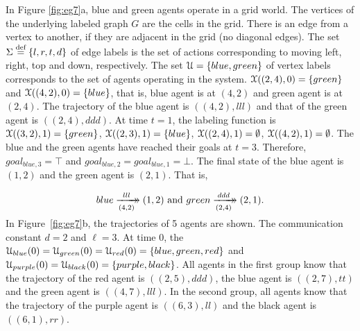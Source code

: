 \begin{eg}
In Figure \ref{fig:eg7}a, blue and green agents operate in a grid world. The vertices of the underlying labeled graph $G$ are the cells in the grid. There is an edge from a vertex to another, if they are adjacent in the grid (no diagonal edges).
The set $\Sigma \stackrel{\text{def}}{=} \{l,r,t,d\}$ of edge labels is the set of actions corresponding to moving left, right, top and down, respectively. The set $\mathcal{U} = \{blue,green\}$ of vertex labels corresponds to the set of agents operating in the system. $\mathcal{X}((2,4),0) = \{green\}$ and $\mathcal{X}((4,2),0) = \{blue\}$, that is, blue agent is at $(4,2)$ and green agent is at $(2,4)$. The trajectory of the blue agent is $((4,2),lll)$ and that of the green agent is $((2,4),ddd)$. At time $t = 1$, the labeling function is $\mathcal{X}((3,2),1) = \{green\}$, $\mathcal{X}((2,3),1) = \{blue\}$, $\mathcal{X}((2,4),1) = \emptyset$, $\mathcal{X}((4,2),1) = \emptyset$.  The blue and the green agents have reached their goals at $t=3$. Therefore, $goal_{blue,3} = \top$ and $goal_{blue,2} = goal_{blue,1} = \bot$. The final state of the blue agent is $(1,2)$ and the green agent is $(2,1)$. That is, 

\begin{small}
\begin{align*}
    blue \dhxrightarrow[(4,2)]{lll}(1,2)~\text{and}~
    green \dhxrightarrow[(2,4)]{ddd}(2,1).
\end{align*}
\end{small}
\end{eg}

 

\begin{eg}
In Figure~\ref{fig:eg7}b, the trajectories of 5 agents are shown. The communication constant $d = 2$ and $\ell = 3$. 
At time $0$, the $\mathcal{U}_{blue}(0)=\mathcal{U}_{green}(0)=\mathcal{U}_{red}(0)= \{blue,green,red\}$ and $\mathcal{U}_{purple}(0) = \mathcal{U}_{black}(0) = \{purple,black\}$. All agents in the first group know that the trajectory of the red agent is $((2,5),ddd)$, the blue agent is $((2,7),tt)$ and the green agent is $((4,7),lll)$. In the second group, all agents know that the trajectory of the purple agent is $((6,3),ll)$ and the black agent is $((6,1),rr)$. 
\end{eg}


